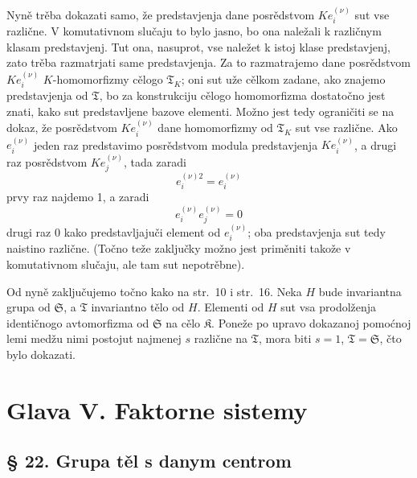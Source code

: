\documentclass[11pt]{article}
\begin{document}
Nyně trěba dokazati samo, že predstavjenja dane posrědstvom \(K e_i^{(\nu)}\) sut vse različne. V komutativnom slučaju to bylo jasno, bo ona naležali k različnym klasam predstavjenj. Tut ona, nasuprot, vse naležet k istoj klase predstavjenj, zato trěba razmatrjati same predstavjenja. Za to razmatrajemo dane posrědstvom \(K e_i^{(\nu)}\) \(K\)-homomorfizmy cělogo \(\mathfrak T_K\); oni sut uže cělkom zadane, ako znajemo predstavjenja od \(\mathfrak T\), bo za konstrukciju cělogo homomorfizma dostatočno jest znati, kako sut predstavljene bazove elementi. Možno jest tedy ograničiti se na dokaz, že posrědstvom \(K e_i^{(\nu)}\) dane homomorfizmy od \(\mathfrak T_K\) sut vse različne. Ako \(e_i^{(\nu)}\) jeden raz predstavimo posrědstvom modula predstavjenja \(K e_i^{(\nu)}\), a drugi raz posrědstvom \(K e_j^{(\nu)}\), tada zaradi
\[
e_i^{(\nu)2}=e_i^{(\nu)}
\]
prvy raz najdemo 1, a zaradi
\[
e_i^{(\nu)}e_j^{(\nu)}=0
\]
drugi raz 0 kako predstavljajuči element od \(e_i^{(\nu)}\); oba predstavjenja sut tedy naistino različne. (Točno teže zaključky možno jest priměniti takože v komutativnom slučaju, ale tam sut nepotrěbne).

Od nyně zaključujemo točno kako na str.~10 i str.~16. Neka \(H\) bude invariantna grupa od \(\mathfrak S\), a \(\mathfrak T\) invariantno tělo od \(H\). Elementi od \(H\) sut vsa prodolženja identičnogo avtomorfizma od \(\mathfrak S\) na cělo \(\mathfrak K\). Poneže po upravo dokazanoj pomoćnoj lemi medžu nimi postojut najmenej \(s\) različne na \(\mathfrak T\), mora biti \(s=1\), \(\mathfrak T=\mathfrak S\), čto bylo dokazati.

\section*{Glava V. Faktorne sistemy}\label{kapitel-v.-faktorensysteme}

\subsection*{§ 22. Grupa těl s danym centrom}\label{die-gruppe-der-koerper-mit-gegebenem-zentrum}
\end{document}
